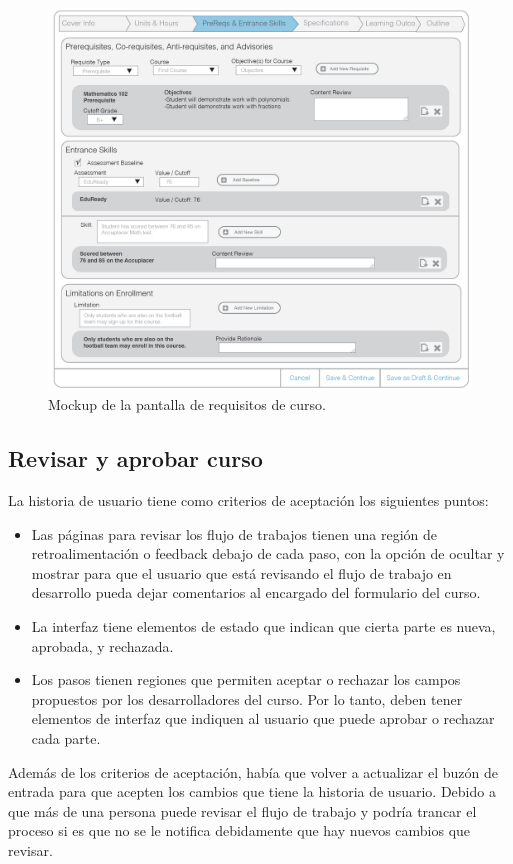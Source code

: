 \begin{figure}[H]
\centering
\includegraphics[scale=0.3]{Capitulos/DesarrollodelaAplicacion/Imagenes/course_req}
\caption{Mockup de la pantalla de requisitos de curso.}
  \label{course_req}
\end{figure}

\subsection{Revisar y aprobar curso}
La historia de usuario tiene como criterios de aceptación los siguientes puntos:
\begin{itemize}
	\item Las páginas para revisar los flujo de trabajos tienen una región de retroalimentación o feedback debajo de cada paso, con la opción de ocultar y mostrar para que el usuario que está revisando el flujo de trabajo en desarrollo pueda dejar comentarios al encargado del formulario del curso.
	\item La interfaz tiene elementos de estado que indican que cierta parte es nueva, aprobada, y rechazada.
	\item Los pasos tienen regiones que permiten aceptar o rechazar los campos propuestos por los desarrolladores del curso. Por lo tanto, deben tener elementos de interfaz que indiquen al usuario que puede aprobar o rechazar cada parte.
\end{itemize}
Además de los criterios de aceptación, había que volver a actualizar el buzón de entrada para que acepten los cambios que tiene la historia de usuario. Debido a que más de una persona puede revisar el flujo de trabajo y podría trancar el proceso si es que no se le notifica debidamente que hay nuevos cambios que revisar.

